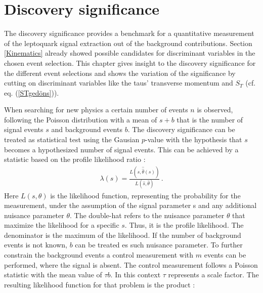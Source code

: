 \section{Discovery significance}\label{significance}
The discovery significance provides a benchmark for a quantitative measurement of the leptoquark signal extraction out of the background contributions. Section \ref{Kinematics} already showed possible candidates for discriminant variables in the chosen event selection. This chapter gives insight to the discovery significance for the different event selections and shows the variation of the significance by cutting on discriminant variables like the taus' transverse momentum and $S_T$ (cf. eq. (\ref{STgedöns})).\par
When searching for new physics a certain number of events $n$ is observed, following the Poisson distribution with a mean of $s+b$ that is the number of signal events $s$ and background events $b$. The discovery significance can be treated as statistical test using the Gausian $p$-value with the hypothesis that $s$ becomes a hypothesized number of signal events. This can be achieved by a statistic based on the profile likelihood ratio \cite{AsimovSignificance}:
\begin{align}
                \lambda(s)=\frac{L\left(s,\hat{\hat{\theta}}(s)\right)}{L\left(\hat{s},\hat{\theta}\right)}\,\text{.}
\label{profilelikelihoodratio}
\end{align}
Here $L(s,\theta)$ is the likelihood function, representing the probability for the measurement, under the assumption of the signal parameter s and any additional nuisance parameter $\theta$. The double-hat refers to the nuisance parameter $\theta$ that maximize the likelihood for a specific $s$. Thus, it is the profile likelihood. The denominator is the maximum of the likelihood. \cite{AsimovSignificance}\newline
If the number of background events is not known, $b$ can be treated es such nuisance parameter. To further constrain the background events a control measurement with $m$ events can be performed, where the signal is absent. The control measurement follows a Poisson statistic with the mean value of $\tau b$. In this context $\tau$ represents a scale factor. The resulting likelihood function for that problem is the product \cite{AsimovSignificance}:
